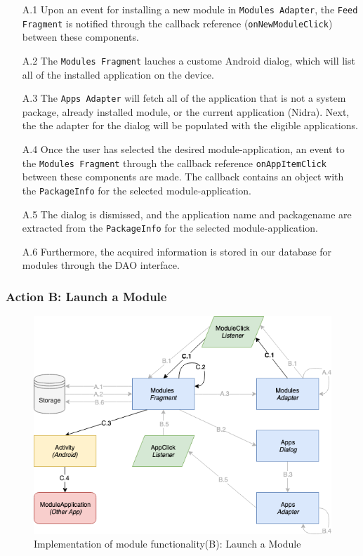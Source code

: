 \begin{itemize}
    \item[A.1] Upon an event for installing a new module in \verb|Modules Adapter|, the \verb|Feed Fragment| is notified through the callback reference (\verb|onNewModuleClick|) between these components.
    \item[A.2] The \verb|Modules Fragment| lauches a custome Android dialog, which will list all of the installed application on the device. 
    \item[A.3] The \verb|Apps Adapter| will fetch all of the application that is not a system package, already installed module, or the current application (Nidra). Next, the the adapter for the dialog will be populated with the eligible applications. 
    \item[A.4] Once the user has selected the desired module-application, an event to the \verb|Modules Fragment| through the callback reference \verb|onAppItemClick| between these components are made. The callback contains an object with the \verb|PackageInfo| for the selected module-application.
    \item[A.5] The dialog is dismissed, and the application name and packagename are extracted from the \verb|PackageInfo| for the selected module-application. 
    \item[A.6] Furthermore, the acquired information is stored in our database for modules through the DAO interface. 
\end{itemize}

\subsubsection{Action B: Launch a Module}
\begin{figure}
    \centering
    \includegraphics[scale=0.6]{images/Module_ImpC.png}
    \caption{Implementation of module functionality(B): Launch a Module}
    \label{fig:impl_modulesC}
\end{figure}

